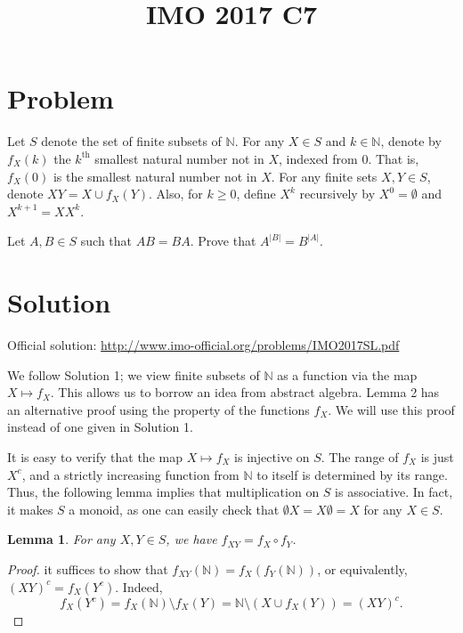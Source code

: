 \documentclass{article}
\title{IMO 2017 C7}
\author{}
\date{}
\newcommand{\N}{\mathbb{N}}
\newtheorem{lemma}{Lemma}
\begin{document}
\maketitle



\section*{Problem}

Let $S$ denote the set of finite subsets of $\N$.
For any $X \in S$ and $k \in \N$, denote by $f_X(k)$ the $k^{\text{th}}$ smallest natural number not in $X$, indexed from $0$.
That is, $f_X(0)$ is the smallest natural number not in $X$.
For any finite sets $X, Y \in S$, denote $XY = X \cup f_X(Y)$.
Also, for $k \geq 0$, define $X^k$ recursively by $X^0 = \emptyset$ and $X^{k + 1} = XX^k$.

Let $A, B \in S$ such that $AB = BA$.
Prove that $A^{|B|} = B^{|A|}$.



\section*{Solution}

Official solution: \url{http://www.imo-official.org/problems/IMO2017SL.pdf}

We follow Solution 1; we view finite subsets of $\N$ as a function via the map $X \mapsto f_X$.
This allows us to borrow an idea from abstract algebra.
Lemma 2 has an alternative proof using the property of the functions $f_X$.
We will use this proof instead of one given in Solution 1.

It is easy to verify that the map $X \mapsto f_X$ is injective on $S$.
The range of $f_X$ is just $X^c$, and a strictly increasing function from $\N$ to itself is determined by its range.
Thus, the following lemma implies that multiplication on $S$ is associative.
In fact, it makes $S$ a monoid, as one can easily check that $\emptyset X = X \emptyset = X$ for any $X \in S$.

\begin{lemma}\label{2017c7-1}
For any $X, Y \in S$, we have $f_{XY} = f_X \circ f_Y$.
\end{lemma}
\begin{proof}
it suffices to show that $f_{XY}(\N) = f_X(f_Y(\N))$, or equivalently, $(XY)^c = f_X(Y^c)$.
Indeed,
\[ f_X(Y^c) = f_X(\N) \setminus f_X(Y) = \N \setminus (X \cup f_X(Y)) = (XY)^c. \]
\end{proof}
\end{document}
